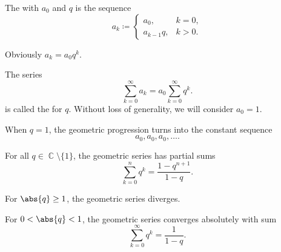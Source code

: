 \begin{definition}\label{def:geometric_progression}
  The  with  \( a_0 \) and  \( q \) is the sequence
  \begin{equation*}
    a_k \coloneqq \begin{cases}
      a_0,       & k = 0, \\
      a_{k-1} q, & k > 0.
    \end{cases}
  \end{equation*}

  \begin{thmenum}
     Obviously \( a_k = a_0 q^k \).

     The series
    \begin{equation*}
      \sum_{k=0}^\infty a_k = a_0 \sum_{k=0}^\infty q^k.
    \end{equation*}
    is called the  for \( q \). Without loss of generality, we will consider \( a_0 = 1 \).

     When \( q = 1 \), the geometric progression turns into the constant sequence
    \begin{equation*}
      a_0, a_0, a_0, \ldots.
    \end{equation*}

     For all \( q \in \BbbC \setminus \{ 1 \} \), the geometric series has partial sums
    \begin{equation}\label{thm:geometric_progression/partial_sum}
      \sum_{k=0}^n q^k = \frac {1 - q^{n+1}} {1 - q}.
    \end{equation}

     For \( \abs{q} \geq 1 \), the geometric series diverges.

     For \( 0 < \abs{q} < 1 \), the geometric series converges absolutely with sum
    \begin{equation}\label{thm:geometric_progression/series_sum}
      \sum_{k=0}^\infty q^k = \frac 1 {1 - q}.
    \end{equation}
  \end{thmenum}
\end{definition}
